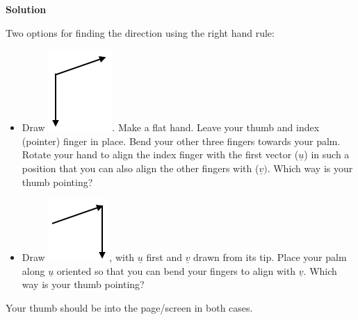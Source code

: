 \documentclass[12pt,letterpaper,noanswers]{exam}
\newcommand{\mb}[1]{\underline{#1}}
\begin{document}
\noindent\textbf{Solution}

\begin{questions}
\item Two options for finding the direction using the right hand rule: 
\begin{itemize}
    \item Draw \includegraphics[scale=0.5]{img/C06p1c.png}.  Make a flat hand.  Leave your thumb and index (pointer) finger in place.  Bend your other three fingers towards your palm.  Rotate your hand to align the index finger with the first vector ($\mb{u}$) in such a position that you can also align the other fingers with ($\mb{v})$.  Which way is your thumb pointing?
    \item Draw \includegraphics[scale=0.5]{img/C06p1d.png}, with $\mb{u}$ first and $\mb{v}$ drawn from its tip.  Place your palm along $\mb{u}$ oriented so that you can bend your fingers to align with $\mb{v}$.  Which way is your thumb pointing?
\end{itemize}
Your thumb should be into the page/screen in both cases.



\end{questions}
\end{document}
